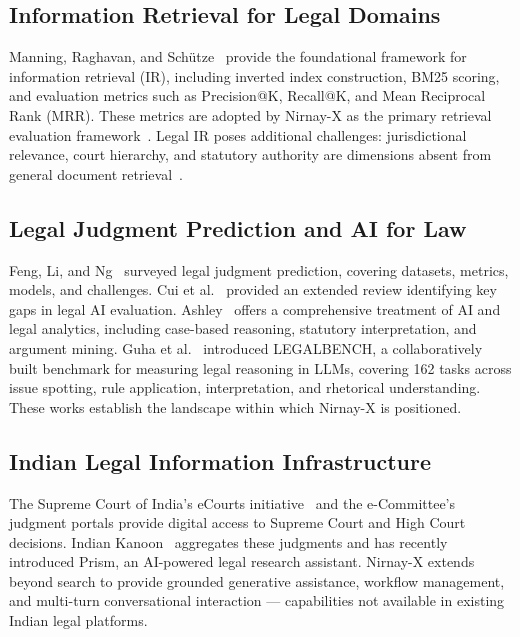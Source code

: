 \documentclass[12pt,a4paper]{article}
\begin{document}
\subsection{Information Retrieval for Legal Domains}

Manning, Raghavan, and Sch\"{u}tze~\cite{manning2008ir} provide the foundational
framework for information retrieval (IR), including inverted index construction,
BM25 scoring, and evaluation metrics such as Precision@K, Recall@K, and Mean
Reciprocal Rank (MRR). These metrics are adopted by Nirnay-X as the primary
retrieval evaluation framework~\cite{manning2008ir}. Legal IR poses additional
challenges: jurisdictional relevance, court hierarchy, and statutory authority
are dimensions absent from general document retrieval~\cite{feng2022survey,
ashley2017ai}.

\subsection{Legal Judgment Prediction and AI for Law}

Feng, Li, and Ng~\cite{feng2022survey} surveyed legal judgment prediction, covering
datasets, metrics, models, and challenges. Cui et al.~\cite{cui2022survey} provided
an extended review identifying key gaps in legal AI evaluation. Ashley~\cite{ashley2017ai}
offers a comprehensive treatment of AI and legal analytics, including case-based
reasoning, statutory interpretation, and argument mining. Guha et al.~\cite{guha2023legalbench}
introduced LEGALBENCH, a collaboratively built benchmark for measuring legal reasoning
in LLMs, covering 162 tasks across issue spotting, rule application, interpretation,
and rhetorical understanding. These works establish the landscape within which Nirnay-X
is positioned.

\subsection{Indian Legal Information Infrastructure}

The Supreme Court of India's eCourts initiative~\cite{ecourts} and the
e-Committee's judgment portals provide digital access to Supreme Court and High Court
decisions. Indian Kanoon~\cite{indiankanoon} aggregates these judgments and has
recently introduced Prism, an AI-powered legal research assistant. Nirnay-X extends
beyond search to provide grounded generative assistance, workflow management, and
multi-turn conversational interaction --- capabilities not available in existing
Indian legal platforms.
\end{document}
